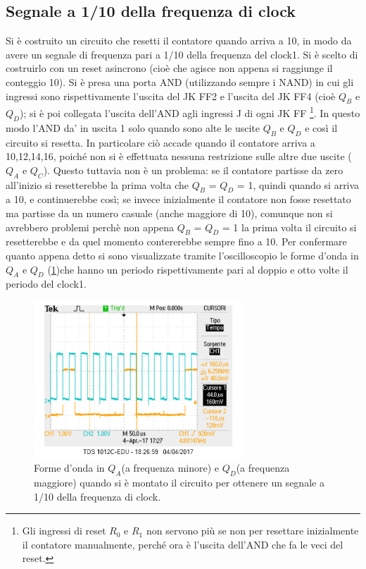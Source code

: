 \documentclass[a4paper,10pt]{article}
\begin{document}
\subsection{Segnale a 1/10 della frequenza di clock}
Si è costruito un circuito che resetti il contatore quando arriva a 10, in modo da avere un segnale di frequenza pari a 1/10 della frequenza del clock1.
Si è scelto di costruirlo con un reset asincrono (cioè che agisce non appena si raggiunge il conteggio 10). Si è presa una porta AND (utilizzando sempre i NAND) in cui gli ingressi sono rispettivamente l'uscita del JK FF2 e l'uscita del JK FF4 (cioè $Q_B$ e $Q_D$); si è poi collegata l'uscita dell'AND agli ingressi J di ogni JK FF \footnote{Gli ingressi di reset $R_0$ e $R_1$ non servono più se non per resettare inizialmente il contatore manualmente, perché ora è l'uscita dell'AND che fa le veci del reset.}. In questo modo l'AND da' in uscita 1 solo quando sono alte le uscite $Q_B$ e $Q_D$ e così il circuito si resetta. In particolare ciò accade quando il contatore arriva a 10,12,14,16, poiché non si è effettuata nessuna restrizione sulle altre due uscite ($Q_A$ e $Q_C$). Questo tuttavia non è un problema: se il contatore partisse da zero all'inizio si resetterebbe la prima volta che $Q_B$ = $Q_D$ = 1, quindi quando si arriva a 10, e continuerebbe così; se invece inizialmente il contatore non fosse resettato ma partisse da un numero casuale (anche maggiore di 10), comunque non si avrebbero problemi perchè non appena $Q_B$ = $Q_D$ = 1 la prima volta il circuito si resetterebbe e da quel momento contererebbe sempre fino a 10. Per confermare quanto appena detto si sono visualizzate tramite l'oscilloscopio le forme d'onda in $Q_A$ e $Q_D$ (\cref{fig:81})che hanno un periodo rispettivamente pari al doppio e otto volte il periodo del clock1.

\begin{figure}[H]
	\centering
	\includegraphics[width=0.7\textwidth]{../grafici/81.png}
	\caption{Forme d'onda in $Q_A$(a frequenza minore) e $Q_D$(a frequenza maggiore) quando si è montato il circuito per ottenere un segnale a 1/10 della frequenza di clock.}
	\label{fig:81}
\end{figure}
\end{document}
